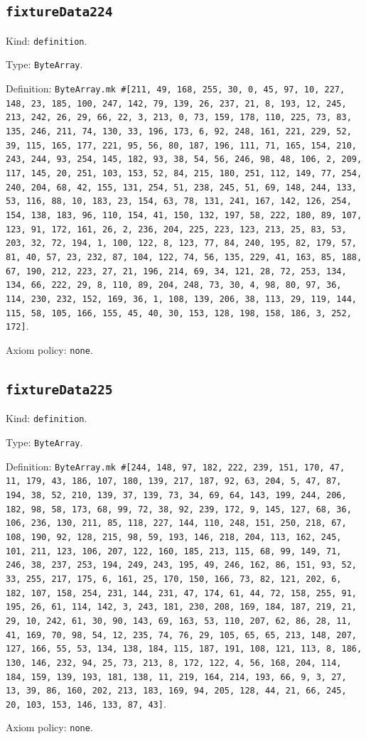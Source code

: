 \documentclass[11pt]{article}
\begin{document}
\subsection*{\texttt{fixtureData224}}
\noindent Kind: \texttt{definition}.\par
\noindent Type: \texttt{ByteArray}.\par
\noindent Definition: \texttt{ByteArray.mk \#[211, 49, 168, 255, 30, 0, 45, 97, 10, 227, 148, 23, 185, 100, 247, 142, 79, 139, 26, 237, 21, 8, 193, 12, 245, 213, 242, 26, 29, 66, 22, 3, 213, 0, 73, 159, 178, 110, 225, 73, 83, 135, 246, 211, 74, 130, 33, 196, 173, 6, 92, 248, 161, 221, 229, 52, 39, 115, 165, 177, 221, 95, 56, 80, 187, 196, 111, 71, 165, 154, 210, 243, 244, 93, 254, 145, 182, 93, 38, 54, 56, 246, 98, 48, 106, 2, 209, 117, 145, 20, 251, 103, 153, 52, 84, 215, 180, 251, 112, 149, 77, 254, 240, 204, 68, 42, 155, 131, 254, 51, 238, 245, 51, 69, 148, 244, 133, 53, 116, 88, 10, 183, 23, 154, 63, 78, 131, 241, 167, 142, 126, 254, 154, 138, 183, 96, 110, 154, 41, 150, 132, 197, 58, 222, 180, 89, 107, 123, 91, 172, 161, 26, 2, 236, 204, 225, 223, 123, 213, 25, 83, 53, 203, 32, 72, 194, 1, 100, 122, 8, 123, 77, 84, 240, 195, 82, 179, 57, 81, 40, 57, 23, 232, 87, 104, 122, 74, 56, 135, 229, 41, 163, 85, 188, 67, 190, 212, 223, 27, 21, 196, 214, 69, 34, 121, 28, 72, 253, 134, 134, 66, 222, 29, 8, 110, 89, 204, 248, 73, 30, 4, 98, 80, 97, 36, 114, 230, 232, 152, 169, 36, 1, 108, 139, 206, 38, 113, 29, 119, 144, 115, 58, 105, 166, 155, 45, 40, 30, 153, 128, 198, 158, 186, 3, 252, 172]}.\par
\noindent Axiom policy: \texttt{none}.\par
\subsection*{\texttt{fixtureData225}}
\noindent Kind: \texttt{definition}.\par
\noindent Type: \texttt{ByteArray}.\par
\noindent Definition: \texttt{ByteArray.mk \#[244, 148, 97, 182, 222, 239, 151, 170, 47, 11, 179, 43, 186, 107, 180, 139, 217, 187, 92, 63, 204, 5, 47, 87, 194, 38, 52, 210, 139, 37, 139, 73, 34, 69, 64, 143, 199, 244, 206, 182, 98, 58, 173, 68, 99, 72, 38, 92, 239, 172, 9, 145, 127, 68, 36, 106, 236, 130, 211, 85, 118, 227, 144, 110, 248, 151, 250, 218, 67, 108, 190, 92, 128, 215, 98, 59, 193, 146, 218, 204, 113, 162, 245, 101, 211, 123, 106, 207, 122, 160, 185, 213, 115, 68, 99, 149, 71, 246, 38, 237, 253, 194, 249, 243, 195, 49, 246, 162, 86, 151, 93, 52, 33, 255, 217, 175, 6, 161, 25, 170, 150, 166, 73, 82, 121, 202, 6, 182, 107, 158, 254, 231, 144, 231, 47, 174, 61, 44, 72, 158, 255, 91, 195, 26, 61, 114, 142, 3, 243, 181, 230, 208, 169, 184, 187, 219, 21, 29, 10, 242, 61, 30, 90, 143, 69, 163, 53, 110, 207, 62, 86, 28, 11, 41, 169, 70, 98, 54, 12, 235, 74, 76, 29, 105, 65, 65, 213, 148, 207, 127, 166, 55, 53, 134, 138, 184, 115, 187, 191, 108, 121, 113, 8, 186, 130, 146, 232, 94, 25, 73, 213, 8, 172, 122, 4, 56, 168, 204, 114, 184, 159, 139, 193, 181, 138, 11, 219, 164, 214, 193, 66, 9, 3, 27, 13, 39, 86, 160, 202, 213, 183, 169, 94, 205, 128, 44, 21, 66, 245, 20, 103, 153, 146, 133, 87, 43]}.\par
\noindent Axiom policy: \texttt{none}.\par
\end{document}
